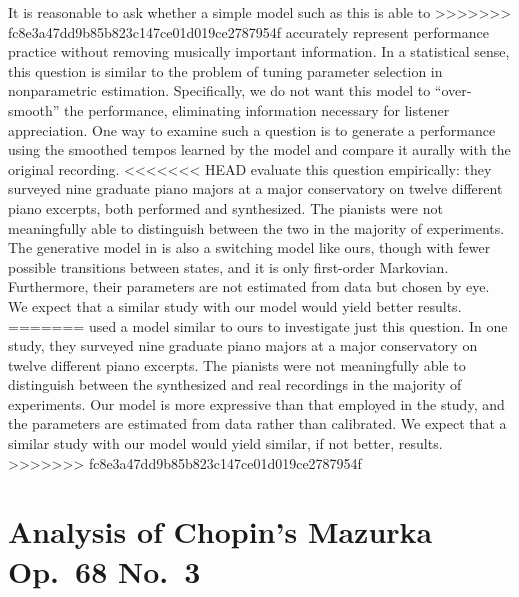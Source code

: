 \documentclass[aoas]{imsart}
\begin{document}
It is reasonable to ask whether a simple model such as this is able to
>>>>>>> fc8e3a47dd9b85b823c147ce01d019ce2787954f
accurately represent performance practice without removing musically important
information. In a statistical sense, this question is similar to the
problem of tuning parameter selection in nonparametric
estimation. Specifically, we do not want this model to
``over-smooth'' the performance, eliminating information necessary for
listener appreciation. One way to examine such a question 
is to generate a performance using the smoothed tempos learned by
the model and compare it aurally with the original recording.
<<<<<<< HEAD
\citet{GuRaphael2012} evaluate this question empirically: they surveyed nine graduate piano majors at a
major conservatory on twelve different piano excerpts, both performed
and synthesized. The pianists
were not meaningfully able to distinguish between the two in the
majority of experiments.
The generative model in \citep{GuRaphael2012} is also a switching model like ours, though with fewer
possible transitions between states, and it is only first-order
Markovian. Furthermore, their parameters are not estimated from data but chosen
by eye. We expect that a similar
study with our model would yield better results.
=======
\citet{GuRaphael2012} used a model similar to ours to investigate just
this question. In one study, they surveyed nine graduate piano majors at a
major conservatory on twelve different piano excerpts. The pianists
were not meaningfully able to distinguish between the synthesized and
real recordings in the majority of experiments. Our model is more
expressive than that employed in the study, and the parameters are
estimated from data rather than calibrated. We expect that a similar
study with our model would yield similar, if not better, results.
>>>>>>> fc8e3a47dd9b85b823c147ce01d019ce2787954f


\section{Analysis of Chopin's Mazurka Op.\ 68 No.\ 3}
\label{sec:analys-chop-mazurka}
\end{document}
